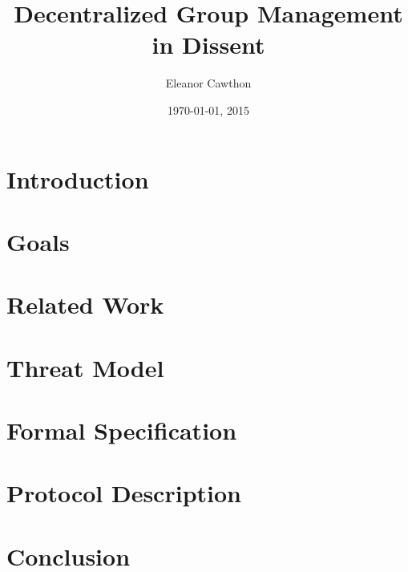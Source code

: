 \documentclass[finalcopy,nolof,nolot]{srpaper}
\title{Decentralized Group Management in Dissent}
\author{Eleanor Cawthon}
\date{\today, 2015}
\begin{document}
\frontmatter

\chapter{Introduction}\label{Chapter:Intro}


\chapter{Goals}\label{Chapter:Goals}


\chapter{Related Work}\label{Chapter:Existing}


\chapter{Threat Model}\label{Chapter:Threats}


\chapter{Formal Specification}\label{Chapter:Spec}


\chapter{Protocol Description}\label{Chapter:Protocol}


\chapter{Conclusion}\label{Chapter:Conclusion}


\listoftodos



% 
\end{document}
